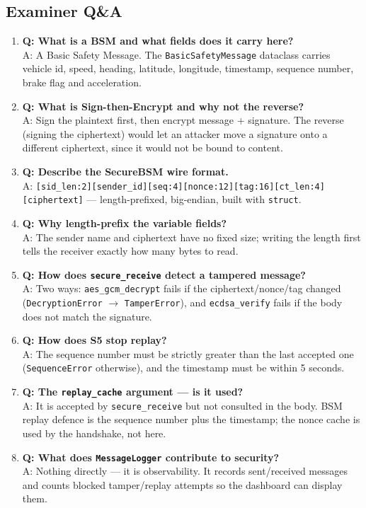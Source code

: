 \documentclass[11pt,a4paper]{article}
\begin{document}
\subsection{Examiner Q\&A}
\begin{enumerate}
  \item \textbf{Q: What is a BSM and what fields does it carry here?}\\
        A: A Basic Safety Message. The \texttt{BasicSafetyMessage} dataclass
        carries vehicle id, speed, heading, latitude, longitude, timestamp,
        sequence number, brake flag and acceleration.
  \item \textbf{Q: What is Sign-then-Encrypt and why not the reverse?}\\
        A: Sign the plaintext first, then encrypt message + signature. The
        reverse (signing the ciphertext) would let an attacker move a signature
        onto a different ciphertext, since it would not be bound to content.
  \item \textbf{Q: Describe the SecureBSM wire format.}\\
        A: \texttt{[sid\_len:2][sender\_id][seq:4][nonce:12][tag:16][ct\_len:4]
        [ciphertext]} --- length-prefixed, big-endian, built with \texttt{struct}.
  \item \textbf{Q: Why length-prefix the variable fields?}\\
        A: The sender name and ciphertext have no fixed size; writing the length
        first tells the receiver exactly how many bytes to read.
  \item \textbf{Q: How does \texttt{secure\_receive} detect a tampered message?}\\
        A: Two ways: \texttt{aes\_gcm\_decrypt} fails if the ciphertext/nonce/tag
        changed (\texttt{DecryptionError} $\to$ \texttt{TamperError}), and
        \texttt{ecdsa\_verify} fails if the body does not match the signature.
  \item \textbf{Q: How does S5 stop replay?}\\
        A: The sequence number must be strictly greater than the last accepted
        one (\texttt{SequenceError} otherwise), and the timestamp must be within
        5 seconds.
  \item \textbf{Q: The \texttt{replay\_cache} argument --- is it used?}\\
        A: It is accepted by \texttt{secure\_receive} but not consulted in the
        body. BSM replay defence is the sequence number plus the timestamp; the
        nonce cache is used by the handshake, not here.
  \item \textbf{Q: What does \texttt{MessageLogger} contribute to security?}\\
        A: Nothing directly --- it is observability. It records sent/received
        messages and counts blocked tamper/replay attempts so the dashboard can
        display them.
\end{enumerate}
\end{document}

